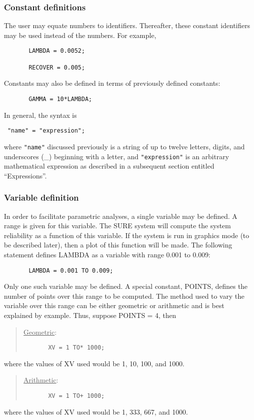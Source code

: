 \subsubsection{Constant definitions} The user may equate numbers to 
identifiers.  Thereafter, these constant identifiers may be used instead of
the numbers.  For example,
\begin{verbatim}
       LAMBDA = 0.0052;

       RECOVER = 0.005;
\end{verbatim}
Constants may also be defined in terms of previously defined constants:
\begin{verbatim}
       GAMMA = 10*LAMBDA;
\end{verbatim}
In general, the syntax is
\begin{verbatim}
 "name" = "expression";
\end{verbatim}
where \verb|"name"| discussed
previously is a string of up to twelve letters, digits, and underscores (\_)
beginning with a letter, and \verb|"expression"| is an arbitrary mathematical
expression as described in a subsequent section entitled ``Expressions''.

\subsubsection{Variable definition} In order to facilitate parametric
 analyses, a single variable may be defined.  A range is given for this
 variable.  The SURE system will compute the system reliability as a function
 of this variable.  If the system is run in graphics mode (to be described
 later), then a plot of this function will be made.  The following statement
 defines {\isf LAMBDA} as a variable with range 0.001 to 0.009:
\begin{verbatim}
       LAMBDA = 0.001 TO 0.009;
\end{verbatim}
Only one such variable may be defined.  A special constant, {\isf POINTS},
defines the number of points over this range to be computed.  The method used
to vary the variable over this range can be either geometric or arithmetic and
is best explained by example.  Thus, suppose {\isf POINTS} = 4, then
\begin{quote}
\underline{Geometric}:
\begin{verbatim}
       XV = 1 TO* 1000;
\end{verbatim}
\end{quote}
where the values of  {\isf XV}  used would be 1, 10, 100, and 1000.
\begin{quote}
\underline{Arithmetic}:
\begin{verbatim}
       XV = 1 TO+ 1000;
\end{verbatim}
\end{quote}
where the values of  {\isf XV}  used would be 1, 333, 667, and 1000.

